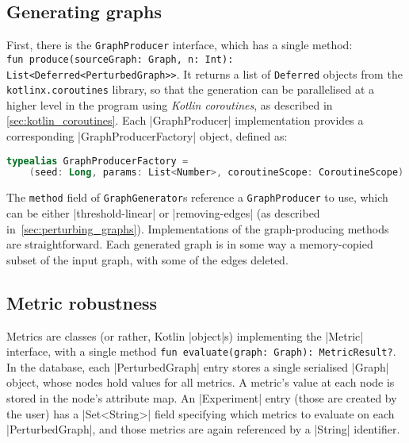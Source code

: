\subsection{Generating graphs}

First, there is the \texttt{GraphProducer} interface, which has a single method:\\ \texttt{fun produce(sourceGraph: Graph, n: Int): List<Deferred<PerturbedGraph>>}.
It returns a list of \texttt{Deferred} objects from the \texttt{kotlinx.coroutines} library, so that the generation can be parallelised at a higher level in the program using \textsl{Kotlin coroutines}, as described in \autoref{sec:kotlin_coroutines}.
Each |GraphProducer| implementation provides a corresponding |GraphProducerFactory| object, defined as:
\begin{lstlisting}[language=Kotlin]
typealias GraphProducerFactory =
    (seed: Long, params: List<Number>, coroutineScope: CoroutineScope) -> GraphProducer
\end{lstlisting}

The \texttt{method} field of \texttt{GraphGenerator}s reference a \texttt{GraphProducer} to use, which can be either |threshold-linear| or |removing-edges| (as described in~\autoref{sec:perturbing_graphs}).
Implementations of the graph-producing methods are straightforward.
Each generated graph is in some way a memory-copied subset of the input graph, with some of the edges deleted.

\subsection{Metric robustness}

Metrics are classes (or rather, Kotlin |object|s) implementing the |Metric| interface, with a single method \texttt{fun evaluate(graph: Graph): MetricResult?}.
In the database, each |PerturbedGraph| entry stores a single serialised |Graph| object, whose nodes hold values for all metrics.
A metric's value at each node is stored in the node's attribute map.
An |Experiment| entry (those are created by the user) has a |Set<String>| field specifying which metrics to evaluate on each |PerturbedGraph|, and those metrics are again referenced by a |String| identifier.

